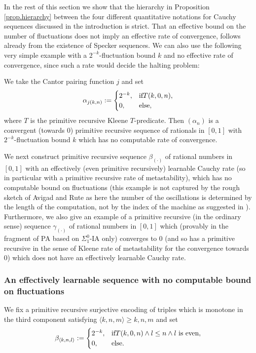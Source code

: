 In the rest of this section we show that the hierarchy in Proposition \ref{prop.hierarchy} 
between the four different 
quantitative notations for Cauchy sequences discussed in the introduction 
is strict. That an effective bound on the number of fluctuations does not imply an 
effective rate of convergence, follows already from the existence of Specker sequences. We can also use the following
very simple example with a $2^{-k}$-fluctuation bound $k$ and no effective rate of convergence, since such a rate would decide the halting problem:\\ 
\begin{prop}[$\alpha_{(\cdot)}$] 
We take the Cantor pairing function $j$ and set
\[
\alpha_{j(k,n)}:=
\begin{cases}
2^{-k}, &\text{if} T(k,0,n),\\
0, &\text{else},
\end{cases}
\]
where $T$ is the primitive recursive Kleene $T$-predicate. Then $(\alpha_n)$ 
is a convergent (towards $0$)
primitive recursive sequence of rationals in $[0,1]$ with $2^{-k}$-fluctuation 
bound $k$ which has no computable 
rate of convergence.
\end{prop}
We next construct primitive recursive sequence $\beta_{(\cdot)}$ of rational 
numbers in $[0,1]$ with an effectively (even primitive recursively) learnable Cauchy rate (so in particular with a primitive recursive rate of metastability), which has no computable bound on fluctuations (this example is not captured by the rough sketch of Avigad and Rute as here the number of the oscillations is determined by the length of the computation, not by the index of the machine as suggested in \cite{Avigad/Rute}). 
Furthermore, we also give an example of a primitive recursive (in the ordinary 
sense) sequence $\gamma_{(\cdot)}$ of rational numbers in $[0,1]$ 
which (provably in the fragment 
of PA based on $\Sigma^0_1$-IA only) converges to $0$ (and so 
has a primitive recursive in the sense of Kleene rate of metastability 
for the convergence towards $0$) 
which does not have an effectively learnable Cauchy rate. 

\subsubsection*{An effectively learnable sequence with no computable bound on fluctuations}

\begin{dfn}[$\beta_{(\cdot)}$]\label{d:beta}
We fix a primitive recursive 
surjective encoding of triples which is monotone in the third component 
satisfying $\langle k,n,m\rangle\ge k,n,m$ and set
\[
\beta_{\langle k,n,l\rangle}:=
\begin{cases}
2^{-k}, &\text{if} T(k,0,n) \wedge l\leq n \wedge l\text{ is even},\\
0, &\text{else}.
\end{cases}
\]
\end{dfn}


